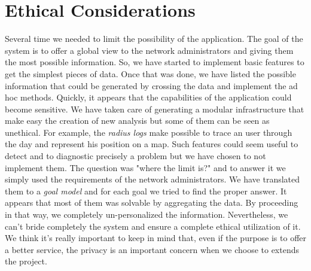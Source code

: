 \section{Ethical Considerations}
Several time we needed to limit the possibility of the application. The goal of the system is to offer a global view to the network administrators and giving them the most possible information. So, we have started to implement basic features to get the simplest pieces of data. Once that was done, we have listed the possible information that could be generated by crossing the data and implement the ad hoc methods. Quickly, it appears that the capabilities of the application could become sensitive. We have taken care of generating a modular infrastructure that make easy the creation of new analysis but some of them can be seen as unethical. For example, the \emph{radius logs} make possible to trace an user through the day and represent his position on a map. Such features could seem useful to detect and to diagnostic precisely a problem but we have chosen to not implement them. The question was "where the limit is?" and to answer it we simply used the requirements of the network administrators. We have translated them to a \emph{goal model} and for each goal we tried to find the proper answer. It appears that most of them was solvable by aggregating the data. By proceeding in that way, we completely un-personalized the information. 
Nevertheless, we can't bride completely the system and ensure a complete ethical utilization of it. We think it's really important to keep in mind that, even if the purpose is to offer a better service, the privacy is an important concern when we choose to extends the project.